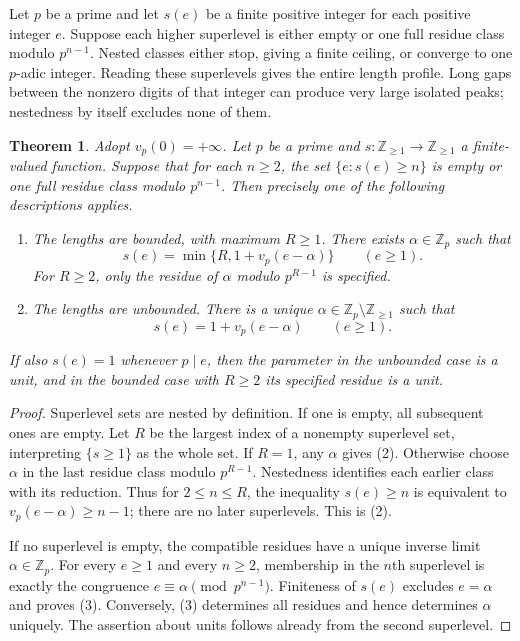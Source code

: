 \documentclass[11pt]{article}
\newtheorem{theorem}{Theorem}
\newcommand{\Z}{\mathbb Z}\newcommand{\Q}{\mathbb Q}
\begin{document}
Let $p$ be a prime and let $s(e)$ be a finite positive integer for each positive integer $e$. Suppose each higher superlevel is either empty or one full residue class modulo $p^{n-1}$. Nested classes either stop, giving a finite ceiling, or converge to one $p$-adic integer. Reading these superlevels gives the entire length profile. Long gaps between the nonzero digits of that integer can produce very large isolated peaks; nestedness by itself excludes none of them.

\begin{theorem}\label{th:profile}
Adopt $v_p(0)=+\infty$. Let $p$ be a prime and $s:\Z_{\ge1}\to\Z_{\ge1}$ a finite-valued function. Suppose that for each $n\ge2$, the set $\{e:s(e)\ge n\}$ is empty or one full residue class modulo $p^{n-1}$. Then precisely one of the following descriptions applies.
\begin{enumerate}
\item The lengths are bounded, with maximum $R\ge1$. There exists $\alpha\in\Z_p$ such that
\[
 s(e)=\min\{R,1+v_p(e-\alpha)\}\qquad(e\ge1).
 \tag{2}
\]
For $R\ge2$, only the residue of $\alpha$ modulo $p^{R-1}$ is specified.
\item The lengths are unbounded. There is a unique $\alpha\in\Z_p\setminus\Z_{\ge1}$ such that
\[
 s(e)=1+v_p(e-\alpha)\qquad(e\ge1).
 \tag{3}
\]
\end{enumerate}
If also $s(e)=1$ whenever $p\mid e$, then the parameter in the unbounded case is a unit, and in the bounded case with $R\ge2$ its specified residue is a unit.
\end{theorem}
\begin{proof}
Superlevel sets are nested by definition. If one is empty, all subsequent ones are empty. Let $R$ be the largest index of a nonempty superlevel set, interpreting $\{s\ge1\}$ as the whole set. If $R=1$, any $\alpha$ gives (2). Otherwise choose $\alpha$ in the last residue class modulo $p^{R-1}$. Nestedness identifies each earlier class with its reduction. Thus for $2\le n\le R$, the inequality $s(e)\ge n$ is equivalent to $v_p(e-\alpha)\ge n-1$; there are no later superlevels. This is (2).

If no superlevel is empty, the compatible residues have a unique inverse limit $\alpha\in\Z_p$. For every $e\ge1$ and every $n\ge2$, membership in the $n$th superlevel is exactly the congruence $e\equiv\alpha\pmod{p^{n-1}}$. Finiteness of $s(e)$ excludes $e=\alpha$ and proves (3). Conversely, (3) determines all residues and hence determines $\alpha$ uniquely. The assertion about units follows already from the second superlevel.
\end{proof}
\end{document}

